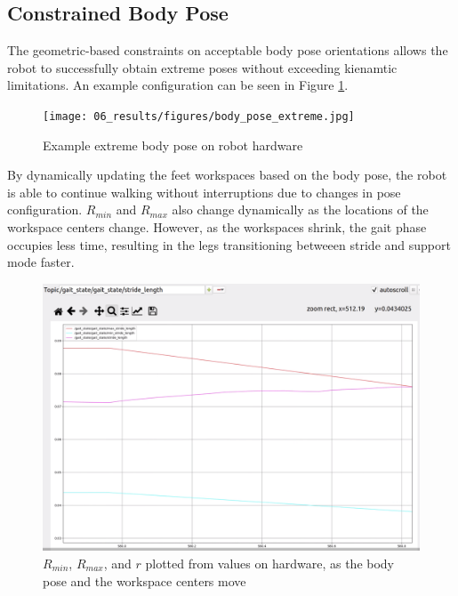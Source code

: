 \subsection{ Constrained Body Pose }

The geometric-based constraints on acceptable body pose orientations allows the robot to successfully obtain extreme poses without exceeding kienamtic limitations. An example configuration can be seen in Figure \ref{fig:pose_example}.

\begin{figure}[H]
    \centerline{\texttt{[image: 06\_results/figures/body\_pose\_extreme.jpg]}}
    \caption{ Example extreme body pose on robot hardware }
    \label{fig:pose_example}
\end{figure}

By dynamically updating the feet workspaces based on the body pose, the robot is able to continue walking without interruptions due to changes in pose configuration. $R_{min}$ and $R_{max}$ also change dynamically as the locations of the workspace centers change. However, as the workspaces shrink, the gait phase occupies less time, resulting in the legs transitioning betweeen stride and support mode faster.

\begin{figure}[H]
    \centerline{\includegraphics[scale=0.065]{06_results/figures/dynamic_stride_length.png}}
    \caption{ $R_{min}$, $R_{max}$, and $r$ plotted from values on hardware, as the body pose and the workspace centers move }
    \label{fig:dynamic_workspace}
\end{figure}
